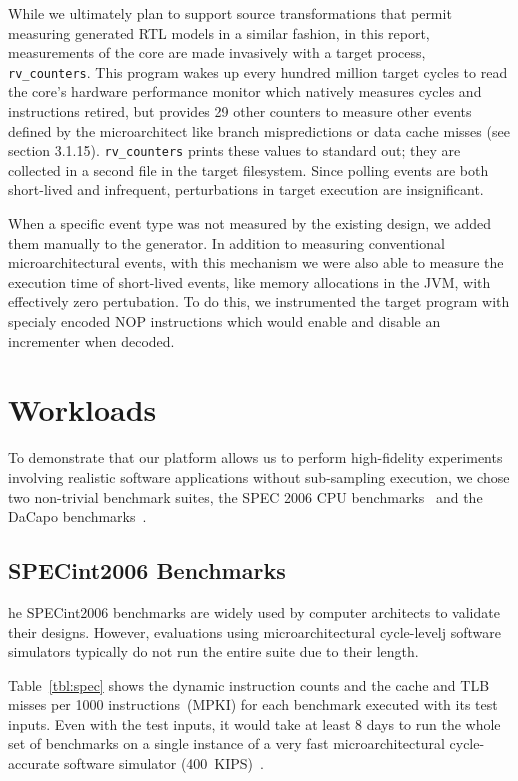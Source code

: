 While we ultimately plan to support source transformations that permit
measuring generated RTL models in a similar fashion, in this report,
measurements of the core are made invasively with a target process,
\texttt{rv\_counters}. This program wakes up every hundred million target
cycles to read the core's hardware performance monitor which natively measures
cycles and instructions retired, but provides 29 other counters to measure
other events defined by the microarchitect like branch mispredictions or data
cache misses (see \cite{Waterman:EECS-2016-161} section 3.1.15).
\texttt{rv\_counters} prints these values to standard out; they are collected
in a second file in the target filesystem.  Since polling events are both
short-lived and infrequent, perturbations in target execution are insignificant.

When a specific event type was not measured by the existing design, we added
them manually to the generator. In addition to measuring conventional
microarchitectural events, with this mechanism we were also able to measure the
execution time of short-lived events, like memory allocations in the JVM, with
effectively zero pertubation. To do this, we instrumented the target program
with specialy encoded NOP instructions which would enable and disable an
incrementer when decoded.

\section{Workloads}

To demonstrate that our platform allows us to perform high-fidelity experiments
involving realistic software applications without sub-sampling execution, we
chose two non-trivial benchmark suites, the SPEC 2006 CPU
benchmarks~\cite{spec_cpu_2006} and the DaCapo benchmarks~\cite{dacapo}.

\subsection{SPECint2006 Benchmarks} he SPECint2006 benchmarks are widely used
by computer architects to validate their designs. However, evaluations using
microarchitectural cycle-levelj software simulators typically do not run the
entire suite due to their length.

Table~\ref{tbl:spec} shows the dynamic instruction counts and the cache and TLB
misses per 1000 instructions~(MPKI) for each benchmark executed with its test
inputs. Even with the test inputs, it would take at least 8 days to run the
whole set of benchmarks on a single instance of a very fast microarchitectural
cycle-accurate software simulator (400~KIPS)~\cite{marssx86}.

